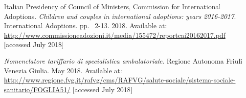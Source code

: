 \begin{thebibliography}{50}
  Italian Presidency of Council of Ministers, Commission for International Adoptions.
  \textit{Children and couples in international adoptions: years 2016-2017}.
  International Adoptions.
  pp. ~2-13.
  2018.
  Available at: \url{http://www.commissioneadozioni.it/media/155472/reportcai20162017.pdf} [accessed July 2018]  
  
  \textit{Nomenclatore tariffario di specialistica ambulatoriale}.
  Regione Autonoma Friuli Venezia Giulia.
  May 2018.
  Available at: \url{http://www.regione.fvg.it/rafvg/cms/RAFVG/salute-sociale/sistema-sociale-sanitario/FOGLIA51/} [accessed July 2018]

\end{thebibliography}